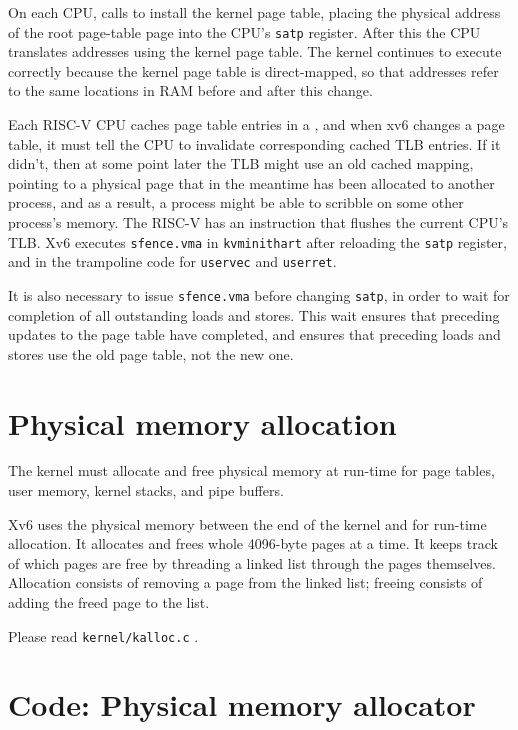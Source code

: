 On each CPU,
calls
to install the kernel page table,
placing
the physical address of the root page-table page
into the CPU's 
\texttt{satp}
register.
After this the CPU translates addresses using the kernel
page table. The kernel continues to execute correctly
because the kernel page table is direct-mapped, so that
addresses refer to the same locations in RAM before
and after this change.

Each RISC-V CPU caches page table entries in a
, and when xv6 changes
a page table, it must tell the CPU to invalidate corresponding
cached TLB entries.  If it didn't,
then at some point later the TLB might
use an old cached mapping, pointing to a physical page that in the meantime
has been allocated to another process, and as a result, a process
might be able to scribble on some other process's memory.  The RISC-V
has an instruction  that flushes
the current CPU's TLB.
Xv6 executes {\tt sfence.vma} in {\tt kvminithart}  after reloading the 
\texttt{satp} register, and in the trampoline code for
\lstinline{uservec} and \lstinline{userret}.

It is also necessary to issue \texttt{sfence.vma} before changing
\texttt{satp}, in order to wait for completion of all outstanding loads and
stores. This wait ensures that preceding updates to the page table have
completed, and ensures that preceding loads and stores use the old
page table, not the new one.

\section{Physical memory allocation}

The kernel must allocate and free physical memory at run-time for
page tables,
user memory,
kernel stacks,
and pipe buffers.

Xv6 uses the physical memory between the end of the kernel and
for run-time allocation. It allocates and frees whole 4096-byte pages
at a time. It keeps track of which pages are free by threading a
linked list through the pages themselves. Allocation consists of
removing a page from the linked list; freeing consists of adding the
freed page to the list.

Please read \lstinline{kernel/kalloc.c} .

\section{Code: Physical memory allocator}

